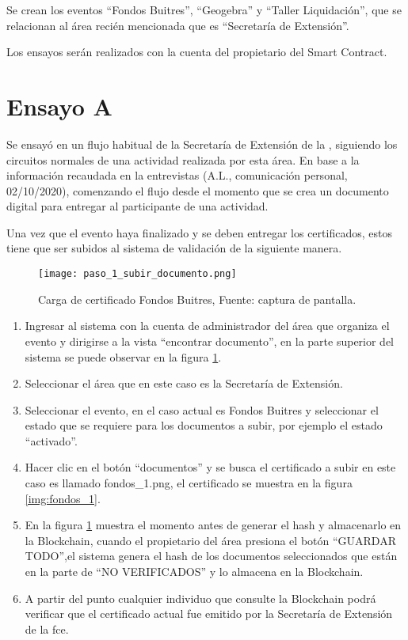 Se  crean los  eventos “Fondos Buitres”, “Geogebra” y “Taller  Liquidación”, que se relacionan al área recién mencionada que es 
“Secretaría de Extensión”.


Los ensayos serán realizados con la cuenta del propietario del Smart Contract.

\section{Ensayo A}
Se ensayó en un flujo habitual de la Secretaría de Extensión de la , 
siguiendo los circuitos normales de una actividad realizada por esta área. En base a la información recaudada en la entrevistas (A.L., comunicación personal, 02/10/2020),
  comenzando el flujo desde el momento que se crea un documento digital para entregar 
al participante de una actividad.

Una vez que el evento haya finalizado y se deben entregar los certificados, estos tiene que ser subidos al sistema de validación de la siguiente manera.
\begin{figure}[H]
  \centering
  {\texttt{[image: paso\_1\_subir\_documento.png]}}
  \caption{Carga de certificado Fondos Buitres,  Fuente: captura de pantalla. }
  \label{img:paso_1}
\end{figure}

\begin{enumerate}
  \item Ingresar al sistema con la cuenta de administrador del área que organiza el evento y dirigirse a la vista “encontrar documento”, en la parte superior del sistema se puede observar en la figura \ref{img:paso_1}.
  \item Seleccionar el área que en este caso es la Secretaría de Extensión.
  \item Seleccionar el evento, en el caso actual es Fondos Buitres y seleccionar el estado que se requiere para los documentos a subir, por ejemplo  el estado “activado”.
  \item Hacer clic en el botón  “documentos” y se busca el certificado a subir en este caso es llamado fondos\_1.png, el certificado se muestra en la figura \ref{img:fondos_1}.
  \item En la figura \ref{img:paso_1} muestra el momento antes de generar el hash y almacenarlo en la Blockchain, cuando el propietario del área presiona el botón “GUARDAR TODO”,el sistema
  genera el hash de  los documentos
  seleccionados que están en la parte de “NO VERIFICADOS” y lo almacena en la Blockchain.
  \item A partir del punto cualquier individuo que consulte la Blockchain podrá verificar que el certificado actual fue emitido por la Secretaría de Extensión de la \gls{fce}. 
\end{enumerate}

